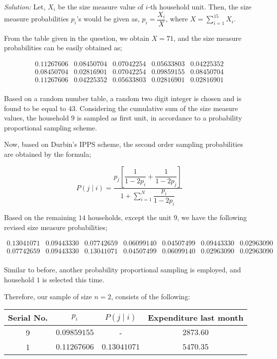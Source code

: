 \documentclass[12pt]{article}
\theoremstyle{definition}
\newenvironment{answer}{\textit{Solution: }\quad }{ \hfill \qedsymbol}
\begin{document}
\begin{answer}
	Let, $X_i$ be the size measure value of $i$-th household unit. Then, the size measure probabilities $p_i$'s would be given as, $p_i = \dfrac{X_i}{X}$, where $X = \sum_{i=1}^{15}X_i$. 

	From the table given in the question, we obtain $X = 71$, and the size measure probabilities can be easily obtained as;

	$$
	\begin{array}{lllll}
		0.11267606 &  0.08450704 & 0.07042254 & 0.05633803 & 0.04225352\\
		0.08450704 & 0.02816901 & 0.07042254 & 0.09859155 & 0.08450704\\
		0.11267606 & 0.04225352 & 0.05633803 & 0.02816901 & 0.02816901\\
	\end{array}
	$$

	Based on a random number table, a random two digit integer is chosen and is found to be equal to $43$. Considering the cumulative sum of the size measure values, the household $9$ is sampled as first unit, in accordance to a probability proportional sampling scheme.

	Now, based on Durbin's IPPS scheme, the second order sampling probabilities are obtained by the formula;

	$$P(j \mid i) = \dfrac{p_j\left[ \dfrac{1}{1 - 2p_i} + \dfrac{1}{1 - 2p_j} \right]}{1 + \sum_{i=1}^{N} \dfrac{p_i}{1 - 2p_i}}$$

	Based on the remaining $14$ households, except the unit $9$, we have the following revised size measure probabilities;

	$$
	\begin{array}{lllllll}
		0.13041071 & 0.09443330 & 0.07742659 & 0.06099140 & 0.04507499 & 0.09443330 & 0.02963090\\
		0.07742659 & 0.09443330 & 0.13041071 & 0.04507499 & 0.06099140 & 0.02963090 & 0.02963090\\
	\end{array}
	$$

	Similar to before, another probability proportional sampling is employed, and household $1$ is selected this time.

	Therefore, our sample of size $n = 2$, consists of the following:

	\begin{table}[h]
		\centering
		\begin{tabular}{|c|c|c|c|}
			\hline
			\textbf{Serial No.} & $p_i$ & $P(j \mid i)$ & \textbf{Expenditure last month}\\
			\hline
			9 & $0.09859155$ & - & $2873.60$\\
			1 & $0.11267606$ & $0.13041071$ & $5470.35$\\
			\hline
		\end{tabular}
	\end{table}


\end{answer}
\end{document}
